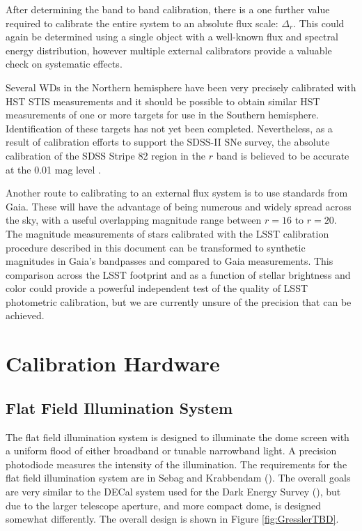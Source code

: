 \documentclass[12pt,preprint]{aastex}
\begin{document}
After determining the band to band calibration, there is a one further
value required to calibrate the entire system to an absolute flux
scale: $\Delta_r$.  This could again be determined using a single
object with a well-known flux and spectral energy distribution,
however multiple external calibrators provide a valuable check on
systematic effects. 

Several WDs in the Northern hemisphere have been very precisely
calibrated with HST STIS measurements \citep{2004AJ....128.3053B} and
it should be possible to obtain similar HST measurements of one or
more targets for use in the Southern hemisphere. Identification of
these targets has not yet been completed. Nevertheless, as a result of
calibration efforts to support the SDSS-II SNe survey, the absolute
calibration of the SDSS Stripe 82 region in the $r$ band is believed
to be accurate at the 0.01 mag level \citep{Frieman2008}. 

Another route to calibrating to an external flux system is to use
standards from Gaia. These will have the advantage of being numerous
and widely spread across the sky, with a useful overlapping magnitude range between
$r=16$ to $r=20$.  The magnitude measurements of stars calibrated with
the LSST calibration procedure described in this document can be
transformed to synthetic magnitudes in Gaia's bandpasses and compared
to Gaia measurements. 
This comparison across the LSST footprint and as
a function of stellar brightness and color could provide a powerful
independent test of the quality of LSST photometric calibration, but we
are currently unsure of the precision that can be achieved. 

\section{Calibration Hardware}
\label{sec:calib_hardware}

\subsection{Flat Field Illumination System}
The flat field illumination system is designed to illuminate the dome screen with a uniform flood of either 
broadband or tunable narrowband light.  A precision photodiode measures the intensity of the illumination.  
The requirements for the flat field illumination system are in Sebag and Krabbendam (\citep{LSE-60}).  The overall
goals are very similar to the DECal system used for the Dark Energy Survey (\citep{Marshall2013}), but due to the 
larger telescope aperture, and more compact dome, is designed somewhat differently.   The overall design is shown
in Figure \ref{fig:GresslerTBD}.
\end{document}
